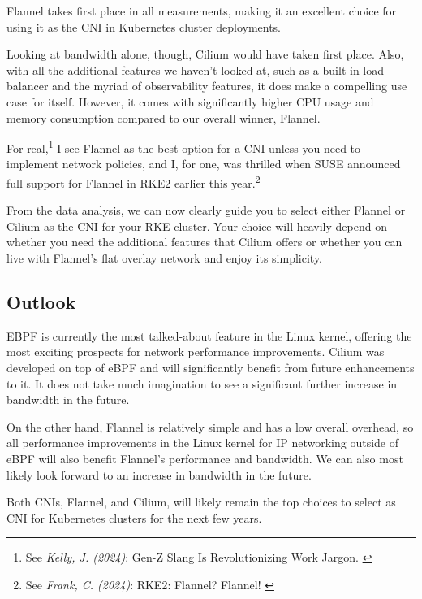 Flannel takes first place in all measurements, making it an excellent choice for using it as the CNI in Kubernetes cluster deployments.

Looking at bandwidth alone, though, Cilium would have taken first place. Also, with all the additional features we haven't looked at, such as a built-in load balancer and the myriad of observability features, it does make a compelling use case for itself. However, it comes with significantly higher CPU usage and memory consumption compared to our overall winner, Flannel.

For real,\footnote{See \textit{Kelly, J. (2024)}: Gen-Z Slang Is Revolutionizing Work Jargon. \cite{genzSlang}} I see Flannel as the best option for a CNI unless you need to implement network policies, and I, for one, was thrilled when SUSE announced full support for Flannel in RKE2 earlier this year.\footnote{See \textit{Frank, C. (2024)}: RKE2: Flannel? Flannel! \cite{rke2Flannel}}

From the data analysis, we can now clearly guide you to select either Flannel or Cilium as the CNI for your RKE cluster. Your choice will heavily depend on whether you need the additional features that Cilium offers or whether you can live with Flannel's flat overlay network and enjoy its simplicity.

\subsection{Outlook}

EBPF is currently the most talked-about feature in the Linux kernel, offering the most exciting prospects for network performance improvements. Cilium was developed on top of eBPF and will significantly benefit from future enhancements to it. It does not take much imagination to see a significant further increase in bandwidth in the future.

On the other hand, Flannel is relatively simple and has a low overall overhead, so all performance improvements in the Linux kernel for IP networking outside of eBPF will also benefit Flannel's performance and bandwidth. We can also most likely look forward to an increase in bandwidth in the future.

Both CNIs, Flannel, and Cilium, will likely remain the top choices to select as CNI for Kubernetes clusters for the next few years.
